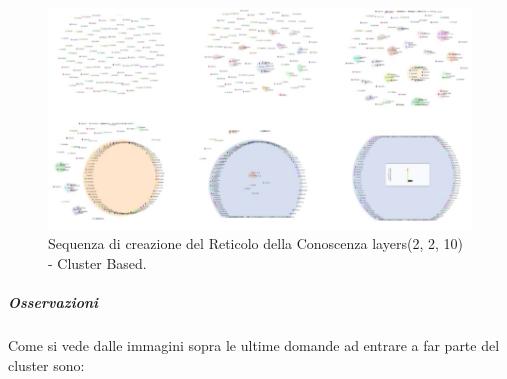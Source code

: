 \begin{figure}[H]
\centering
	\includegraphics[width=0.70\linewidth]{./image/collage_reticolo-sql(2,2,10).png}
	\caption{Sequenza di creazione del Reticolo della Conoscenza layers(2, 2, 10) - Cluster Based.}
	\label{Sequenza di creazione del Reticolo della Conoscenza layers(2, 2, 10) - Cluster Based.}
\end{figure}
\noindent

\subparagraph{Osservazioni}\mbox{}
\noindent
Come si vede dalle immagini sopra le ultime domande ad entrare a far parte del cluster sono:

